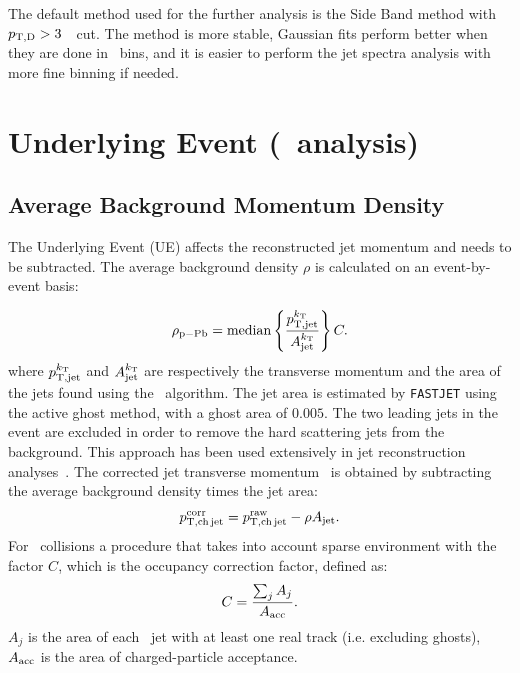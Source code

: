 The default method used for the further analysis is the Side Band method with $p_{\mathrm{T,D}}>3$~\GeVc\ cut. The method is more stable, Gaussian fits perform better when they are done in \ptd\ bins, and it is easier to perform the jet spectra analysis with more fine binning if needed.


\section{Underlying Event (\pPb\ analysis)}
\subsection{Average Background Momentum Density}
\label{sBackSub}

The Underlying Event (UE) affects the reconstructed jet momentum and needs to be subtracted.
The average background density $\rho$ is calculated on an event-by-event basis:

\begin{equation}
\label{eq_rho_pPB}
\rho_{\rm p-Pb} = {\rm median}\left\{\frac{p_{\rm T,jet}^{k_{\mathrm{T}}}}{A_{\rm jet}^{k_{\mathrm{T}}}}\right\} C.
\end{equation}
where $p_{\rm T,jet}^{k_{\mathrm{T}}}$ and $A_{\rm jet}^{k_{\mathrm{T}}}$ are respectively the transverse momentum and the area of
the jets found using the \kt\ algorithm. 
The jet area is estimated by \texttt{FASTJET} using the active ghost method, with a ghost area of $0.005$.
The two leading jets in the event are excluded in order to remove the hard scattering jets from the background.
This approach has been used extensively in jet reconstruction analyses~\cite{ALICE:2014a, ALICE:2015a}.
The corrected jet transverse momentum \ptchjetcorr\ is obtained by subtracting the average background density times the jet area:
\begin{equation}
\label{eq_jet_backsub}
p_{\mathrm{T,ch\,jet}}^{\mathrm{corr}} = p_{\mathrm{T,ch\,jet}}^{\mathrm{raw}} - \rho A_{\rm jet}.
\end{equation}
For \pPb\ collisions a procedure that takes into account sparse environment with the factor $C$, which is the occupancy correction factor, defined as:
\begin{equation}
\label{eq_Cfac}
C = \frac{\sum_{j}A_{j}}{A_{\rm acc}}.
\end{equation}
$A_{j}$ is the area of each \kt\ jet with at least one real track (i.e. excluding ghosts), $A_{\rm acc}$ is the area of charged-particle acceptance.

